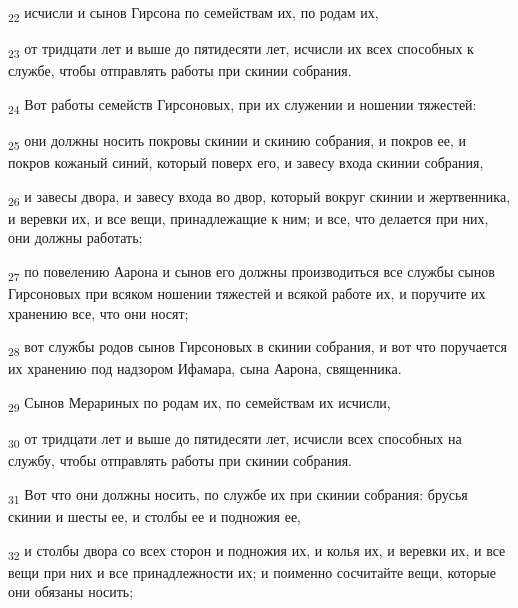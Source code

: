 \begin{tcolorbox}
\textsubscript{22} исчисли и сынов Гирсона по семействам их, по родам их,
\end{tcolorbox}
\begin{tcolorbox}
\textsubscript{23} от тридцати лет и выше до пятидесяти лет, исчисли их всех способных к службе, чтобы отправлять работы при скинии собрания.
\end{tcolorbox}
\begin{tcolorbox}
\textsubscript{24} Вот работы семейств Гирсоновых, при их служении и ношении тяжестей:
\end{tcolorbox}
\begin{tcolorbox}
\textsubscript{25} они должны носить покровы скинии и скинию собрания, и покров ее, и покров кожаный синий, который поверх его, и завесу входа скинии собрания,
\end{tcolorbox}
\begin{tcolorbox}
\textsubscript{26} и завесы двора, и завесу входа во двор, который вокруг скинии и жертвенника, и веревки их, и все вещи, принадлежащие к ним; и все, что делается при них, они должны работать;
\end{tcolorbox}
\begin{tcolorbox}
\textsubscript{27} по повелению Аарона и сынов его должны производиться все службы сынов Гирсоновых при всяком ношении тяжестей и всякой работе их, и поручите их хранению все, что они носят;
\end{tcolorbox}
\begin{tcolorbox}
\textsubscript{28} вот службы родов сынов Гирсоновых в скинии собрания, и вот что поручается их хранению под надзором Ифамара, сына Аарона, священника.
\end{tcolorbox}
\begin{tcolorbox}
\textsubscript{29} Сынов Мерариных по родам их, по семействам их исчисли,
\end{tcolorbox}
\begin{tcolorbox}
\textsubscript{30} от тридцати лет и выше до пятидесяти лет, исчисли всех способных на службу, чтобы отправлять работы при скинии собрания.
\end{tcolorbox}
\begin{tcolorbox}
\textsubscript{31} Вот что они должны носить, по службе их при скинии собрания: брусья скинии и шесты ее, и столбы ее и подножия ее,
\end{tcolorbox}
\begin{tcolorbox}
\textsubscript{32} и столбы двора со всех сторон и подножия их, и колья их, и веревки их, и все вещи при них и все принадлежности их; и поименно сосчитайте вещи, которые они обязаны носить;
\end{tcolorbox}
